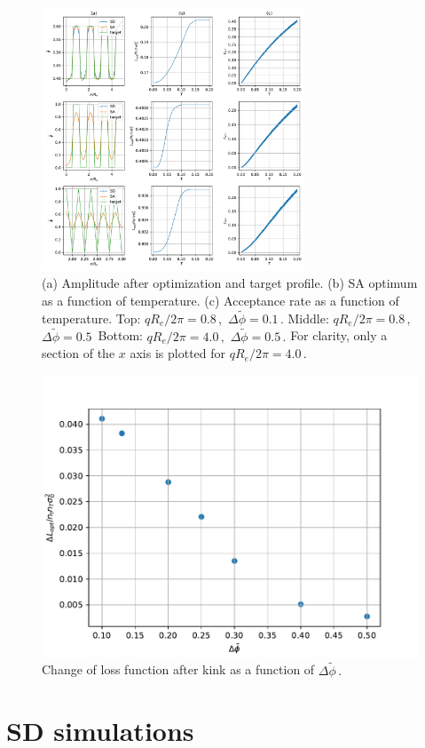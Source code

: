 \documentclass[bachelor,       %
               twoside,        %
               BCOR10mm,       %
               ngerman, english %
               ]{GAUBM}
\begin{document}
\begin{figure}[H]
    \centering
    \includegraphics[width=0.7\textwidth]{Thesis/figures/comparison_sd_sa.pdf}
    \caption{(a) Amplitude after optimization and target profile. (b) \ac{SA} optimum as a function of temperature. (c) Acceptance rate as a function of temperature. Top: $qR_e/2\pi=0.8\,,$ $\Delta\tilde\phi=0.1\,.$ Middle: $qR_e/2\pi=0.8\,,$ $\Delta\tilde\phi=0.5\,$ Bottom: $qR_e/2\pi=4.0\,,$ $\Delta\tilde\phi=0.5\,.$ For clarity, only a section of the $x$ axis is plotted for $qR_e/2\pi=4.0\,.$}
    \label{fig:comparison_sd_sa}
\end{figure}

\begin{figure}[h]
    \centering
    \includegraphics[width=0.5
    \linewidth]{figures/dL-dphi.pdf}
    \caption{Change of loss function after kink as a function of $\Delta\tilde\phi\,.$}
    \label{fig:dl_dphi}
\end{figure}






\section{SD simulations}
\end{document}
